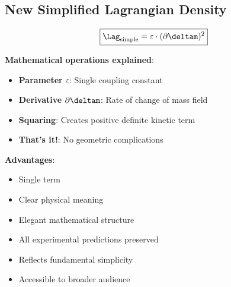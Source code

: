 	\subsection{New Simplified Lagrangian Density}
	
	\begin{equation}
		\boxed{\Lag_{\text{simple}} = \varepsilon \cdot (\partial \deltam)^2}
	\end{equation}
	
	\textbf{Mathematical operations explained}:
	\begin{itemize}
		\item \textbf{Parameter} $\varepsilon$: Single coupling constant
		\item \textbf{Derivative} $\partial \deltam$: Rate of change of mass field
		\item \textbf{Squaring}: Creates positive definite kinetic term
		\item \textbf{That's it!}: No geometric complications
	\end{itemize}
	
	\textbf{Advantages}:
	\begin{itemize}
		\item Single term
		\item Clear physical meaning
		\item Elegant mathematical structure
		\item All experimental predictions preserved
		\item Reflects fundamental simplicity
		\item Accessible to broader audience
	\end{itemize}
	
	\begin{table}[htbp]
		\centering
		\caption{Comparison of complex and simple Lagrangian density}
		\label{tab:complexity_comparison}
	\end{table}
	
